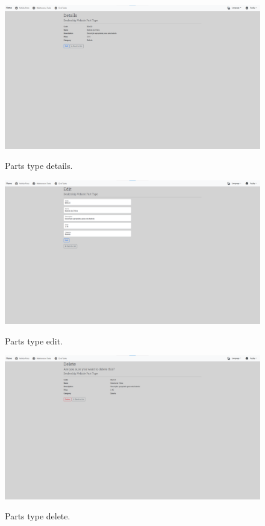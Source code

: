 \begin{figure}[htbp]
  \caption{Parts type details.}
  \centering
  \includegraphics[width=\textwidth]{figs/Implementation/dealershipAdmin/partsDetails}
  \label{fig:partsDetails}
\end{figure}

\begin{figure}[htbp]
  \caption{Parts type edit.}
  \centering
  \includegraphics[width=\textwidth]{figs/Implementation/dealershipAdmin/partsEdit}
  \label{fig:partsEdit}
\end{figure}

\begin{figure}[htbp]
  \caption{Parts type delete.}
  \centering
  \includegraphics[width=\textwidth]{figs/Implementation/dealershipAdmin/partsDelete}
  \label{fig:partsDelete}
\end{figure}


